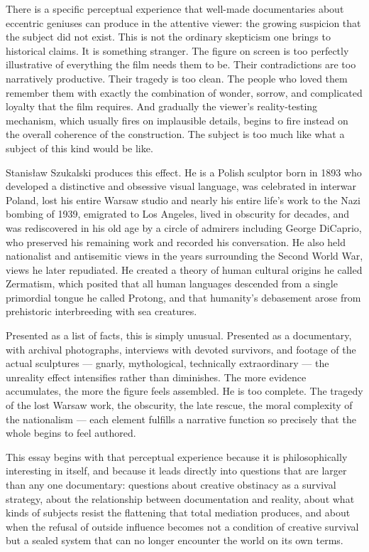 \documentclass[11pt, a4paper]{article}
\theoremstyle{named}
\begin{document}
There is a specific perceptual experience that well-made documentaries
about eccentric geniuses can produce in the attentive viewer: the
growing suspicion that the subject did not exist. This is not the
ordinary skepticism one brings to historical claims. It is something
stranger. The figure on screen is too perfectly illustrative of
everything the film needs them to be. Their contradictions are too
narratively productive. Their tragedy is too clean. The people who
loved them remember them with exactly the combination of wonder,
sorrow, and complicated loyalty that the film requires. And gradually
the viewer's reality-testing mechanism, which usually fires on
implausible details, begins to fire instead on the overall coherence
of the construction. The subject is too much like what a subject of
this kind would be like.

Stanis\l{}aw Szukalski produces this effect. He is a Polish sculptor
born in 1893 who developed a distinctive and obsessive visual language,
was celebrated in interwar Poland, lost his entire Warsaw studio and
nearly his entire life's work to the Nazi bombing of 1939, emigrated
to Los Angeles, lived in obscurity for decades, and was rediscovered
in his old age by a circle of admirers including George DiCaprio, who
preserved his remaining work and recorded his conversation. He also
held nationalist and antisemitic views in the years surrounding the
Second World War, views he later repudiated. He created a theory of
human cultural origins he called Zermatism, which posited that all
human languages descended from a single primordial tongue he called
Protong, and that humanity's debasement arose from prehistoric
interbreeding with sea creatures.

Presented as a list of facts, this is simply unusual. Presented as a
documentary, with archival photographs, interviews with devoted
survivors, and footage of the actual sculptures — gnarly, mythological,
technically extraordinary — the unreality effect intensifies rather
than diminishes. The more evidence accumulates, the more the figure
feels assembled. He is too complete. The tragedy of the lost Warsaw
work, the obscurity, the late rescue, the moral complexity of the
nationalism — each element fulfills a narrative function so precisely
that the whole begins to feel authored.

This essay begins with that perceptual experience because it is
philosophically interesting in itself, and because it leads directly
into questions that are larger than any one documentary: questions
about creative obstinacy as a survival strategy, about the relationship
between documentation and reality, about what kinds of subjects resist
the flattening that total mediation produces, and about when the
refusal of outside influence becomes not a condition of creative
survival but a sealed system that can no longer encounter the world
on its own terms.
\end{document}
